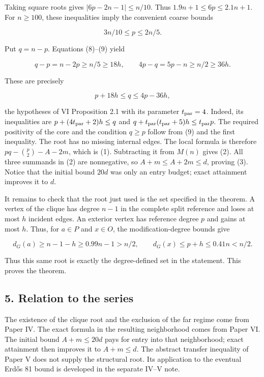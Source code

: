 \documentclass[english,11pt,a4paper]{article}
\begin{document}
Taking square roots gives \(|6p-2n-1|\le n/10\). Thus
\(1.9n+1\le6p\le2.1n+1\). For \(n\ge100\), these inequalities imply the
convenient coarse bounds

\[
3n/10\le p\le2n/5.
\tag{9}
\]

Put \(q=n-p\). Equations (8)--(9) yield

\[
q-p=n-2p\ge n/5\ge18h,
\qquad 4p-q=5p-n\ge n/2\ge36h.
\]

These are precisely

\[
p+18h\le q\le4p-36h,
\]

the hypotheses of VI Proposition 2.1 with its parameter
\(t_{\rm par}=4\). Indeed, its inequalities are
\(p+(4t_{\rm par}+2)h\le q\) and
\(q+t_{\rm par}(t_{\rm par}+5)h\le t_{\rm par}p\). The required
positivity of the core and the condition \(q\ge p\) follow from (9) and
the first inequality. The root has no missing internal edges. The local
formula is therefore \(pq-\binom p2-A-2m\), which is (1). Subtracting it
from \(M(n)\) gives (2). All three summands in (2) are nonnegative, so
\(A+m\le A+2m\le d\), proving (3). Notice that the initial bound \(20d\)
was only an entry budget; exact attainment improves it to \(d\).

It remains to check that the root just used is the set specified in the
theorem. A vertex of the clique has degree \(n-1\) in the complete split
reference and loses at most \(h\) incident edges. An exterior vertex has
reference degree \(p\) and gains at most \(h\). Thus, for \(a\in P\) and
\(x\in O\), the modification-degree bounds give

\[
d_G(a)\ge n-1-h\ge0.99n-1>n/2,
\qquad d_G(x)\le p+h\le0.41n<n/2.
\]

Thus this same root is exactly the degree-defined set in the statement.
This proves the theorem.

\subsection{5. Relation to the series}\label{relation-to-the-series}

The existence of the clique root and the exclusion of the far regime
come from Paper IV. The exact formula in the resulting neighborhood
comes from Paper VI. The initial bound \(A+m\le20d\) pays for entry into
that neighborhood; exact attainment then improves it to \(A+m\le d\).
The abstract transfer inequality of Paper V does not supply the
structural root. Its application to the eventual Erdős 81 bound is
developed in the separate IV--V note.
\end{document}
